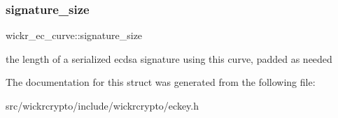 \subsubsection{\texorpdfstring{signature\+\_\+size}{signature\_size}}
{\footnotesize\ttfamily wickr\+\_\+ec\+\_\+curve\+::signature\+\_\+size}

the length of a serialized ecdsa signature using this curve, padded as needed 

The documentation for this struct was generated from the following file\+:\begin{DoxyCompactItemize}
\item 
src/wickrcrypto/include/wickrcrypto/eckey.\+h\end{DoxyCompactItemize}
